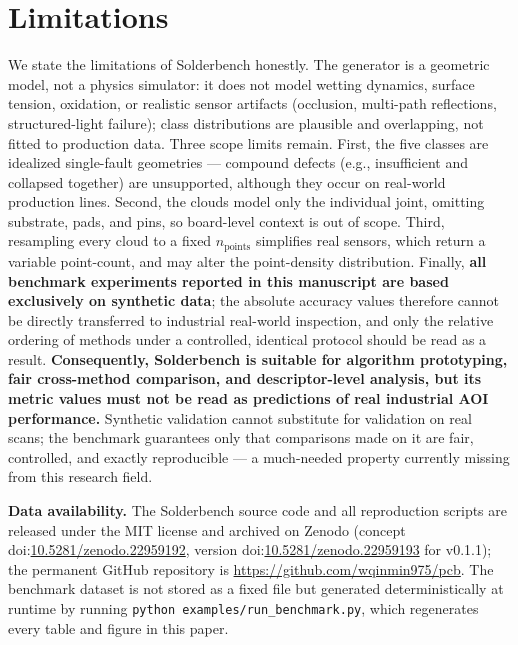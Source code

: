 \documentclass[3p]{elsarticle}
\begin{document}
\section{Limitations}
We state the limitations of Solderbench honestly.
The generator is a geometric model, not a physics simulator: it does not model wetting dynamics, surface tension, oxidation, or realistic sensor artifacts (occlusion, multi-path reflections, structured-light failure); class distributions are plausible and overlapping, not fitted to production data. Three scope limits remain. First, the five classes are idealized single-fault geometries --- compound defects (e.g., insufficient and collapsed together) are unsupported, although they occur on real-world production lines. Second, the clouds model only the individual joint, omitting substrate, pads, and pins, so board-level context is out of scope. Third, resampling every cloud to a fixed $n_{\mathrm{points}}$ simplifies real sensors, which return a variable point-count, and may alter the point-density distribution. Finally, \textbf{all benchmark experiments reported in this manuscript are based exclusively on synthetic data}; the absolute accuracy values therefore cannot be directly transferred to industrial real-world inspection, and only the relative ordering of methods under a controlled, identical protocol should be read as a result.
\textbf{Consequently, Solderbench is suitable for algorithm prototyping, fair cross-method comparison, and descriptor-level analysis, but its metric values must not be read as predictions of real industrial AOI performance.} Synthetic validation cannot substitute for validation on real scans; the benchmark guarantees only that comparisons made on it are fair, controlled, and exactly reproducible --- a much-needed property currently missing from this research field.

\begin{sloppypar}\noindent\textbf{Data availability.} The Solderbench source code and all reproduction scripts are released under the MIT license and archived on Zenodo (concept doi:\url{10.5281/zenodo.22959192}, version doi:\url{10.5281/zenodo.22959193} for v0.1.1); the permanent GitHub repository is \url{https://github.com/wqinmin975/pcb}. The benchmark dataset is not stored as a fixed file but generated deterministically at runtime by running \texttt{python examples/run\_benchmark.py}, which regenerates every table and figure in this paper.\end{sloppypar}
\end{document}
